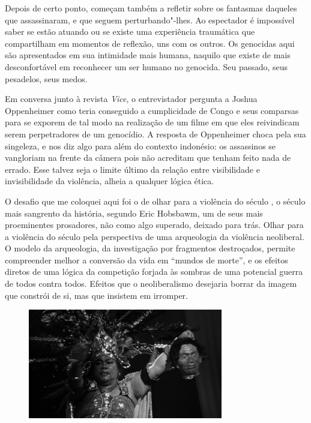 Depois de certo ponto, começam também a refletir sobre os fantasmas
daqueles que assassinaram, e que seguem perturbando"-lhes. Ao espectador
é impossível saber se estão atuando ou se existe uma experiência
traumática que compartilham em momentos de reflexão, uns com os outros.
Os genocidas aqui são apresentados em sua intimidade mais humana,
naquilo que existe de mais desconfortável em reconhecer um ser humano no
genocida. Seu passado, seus pesadelos, seus medos.

\asterisc

Em conversa junto à revista \emph{Vice}, o entrevistador pergunta a Joshua
Oppenheimer como teria conseguido a cumplicidade de Congo e seus
comparsas para se exporem de tal modo na realização de um filme em que
eles reivindicam serem perpetradores de um genocídio. A resposta de
Oppenheimer choca pela sua singeleza, e nos diz algo para além do
contexto indonésio: os assassinos se vangloriam na frente da câmera
pois não acreditam que tenham feito nada de errado. Esse talvez seja o
limite último da relação entre visibilidade e invisibilidade da
violência, alheia a qualquer lógica ética.

\asterisc

O desafio que me coloquei aqui foi o de olhar para a violência do século , o século mais sangrento
da história, segundo Eric Hobsbawm, um de seus mais proeminentes
prosadores, não como algo superado, deixado para trás. Olhar para a
violência do século  pela perspectiva de uma arqueologia da violência
neoliberal. O modelo da arqueologia, da investigação por fragmentos
destroçados, permite compreender melhor a conversão da vida em ``mundos
de morte'', e os efeitos diretos de uma lógica da competição forjada às
sombras de uma potencial guerra de todos contra todos. Efeitos que o neoliberalismo
desejaria borrar da imagem que constrói de
si, mas que insistem em irromper.

\pagebreak
\thispagestyle{empty}

\begin{vplace}[.6]
\begin{figure}[!ht]
\centering
 \includegraphics[width=85mm]{./imgs/frame2.jpg}
\caption{\tiny{}}
\end{figure}
\end{vplace}

